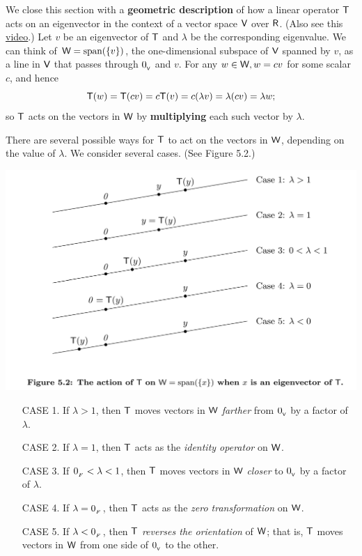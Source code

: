 We close this section with a \textbf{geometric description} of how a linear operator \(\textsf{T}\) acts on an eigenvector in the context of a vector space \(\textsf{V}\) over \(\textsf{R}\).
(Also see this \href{https://www.youtube.com/watch?v=PFDu9oVAE-g&ab_channel=3Blue1Brown}{video}.)
Let \(v\) be an eigenvector of \(\textsf{T}\) and \(\lambda\) be the corresponding eigenvalue.
We can think of \(\textsf{W} = \operatorname{span}(\{ v \})\), the one-dimensional subspace of \(\textsf{V}\) spanned by \(v\), as a line in \(\textsf{V}\) that passes through \(0_{_{\textsf{V}}}\) and \(v\).
For any \(w \in \textsf{W}, w = cv\) for some scalar \(c\),
and hence
\[
    \textsf{T}(w) = \textsf{T}(cv) = c\textsf{T}(v) = c (\lambda v) = \lambda (c v) = \lambda w;
\]
so \(\textsf{T}\) acts on the vectors in \(\textsf{W}\) by \textbf{multiplying} each such vector by \(\lambda\).

There are several possible ways for \(\textsf{T}\) to act on the vectors in \(\textsf{W}\), depending on the value of \(\lambda\).
We consider several cases. (See Figure 5.2.)

\includegraphics[width=17cm]{images/figure-5-2.png}

\begin{enumerate}
\item[CASE 1.] If \(\lambda > 1\), then \(\textsf{T}\) moves vectors in \(\textsf{W}\) \emph{farther} from \(0_{_{\textsf{V}}}\) by a factor of \(\lambda\).
\item[CASE 2.] If \(\lambda = 1\), then \(\textsf{T}\) acts as the \emph{identity operator} on \(\textsf{W}\).
\item[CASE 3.] If \(0_{_F} < \lambda < 1\), then \(\textsf{T}\) moves vectors in \(\textsf{W}\) \emph{closer} to \(0_{_{\textsf{V}}}\) by a factor of \(\lambda\).
\item[CASE 4.] If \(\lambda = 0_{_F}\), then \(\textsf{T}\) acts as the \emph{zero transformation} on \(\textsf{W}\).
\item[CASE 5.] If \(\lambda < 0_{_F}\), then \(\textsf{T}\) \emph{reverses the orientation} of \(\textsf{W}\); that is, \(\textsf{T}\) moves vectors in \(\textsf{W}\) from one side of \(0_{_{\textsf{V}}}\) to the other.
\end{enumerate}

